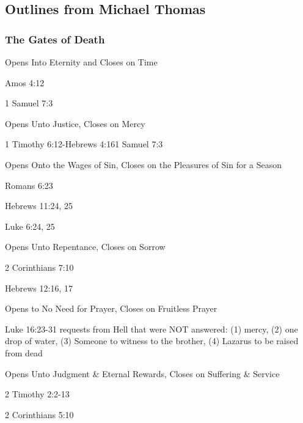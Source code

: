 \subsection{Outlines from Michael Thomas}


\subsubsection{The Gates of Death}



\begin{compactenum}[I.][6]
	\item Opens Into Eternity and Closes on Time
	\begin{compactenum}[A.]
	    \item Amos 4:12
	    \item 1 Samuel 7:3
	\end{compactenum}
	\item Opens Unto Justice, Closes on Mercy
	\begin{compactenum}[A.]
	    \item 1 Timothy 6:12-Hebrews 4:161 Samuel 7:3
	\end{compactenum}
	\item Opens Onto the Wages of Sin, Closes on the Pleasures of Sin for a Season
	\begin{compactenum}[A.]
	    \item Romans 6:23
	    \item Hebrews 11:24, 25
	    \item Luke 6:24, 25
	\end{compactenum}
	\item Opens Unto Repentance, Closes on Sorrow
	\begin{compactenum}[A.]
	    \item 2 Corinthians 7:10
	    \item Hebrews 12:16, 17
	\end{compactenum}
	\item Opens to No Need for Prayer, Closes on Fruitless Prayer
	\begin{compactenum}[A.]
	    \item Luke 16:23-31 requests from Hell that were NOT answered: (1) mercy, (2) one drop of water, (3) Someone to witness to the brother, (4) Lazarus to be raised from dead
	\end{compactenum}
	\item Opens Unto Judgment \& Eternal Rewards, Closes on Suffering \& Service
	\begin{compactenum}[A.]
	    \item 2 Timothy 2:2-13
	    \item 2 Corinthians 5:10
	\end{compactenum}
\end{compactenum}

